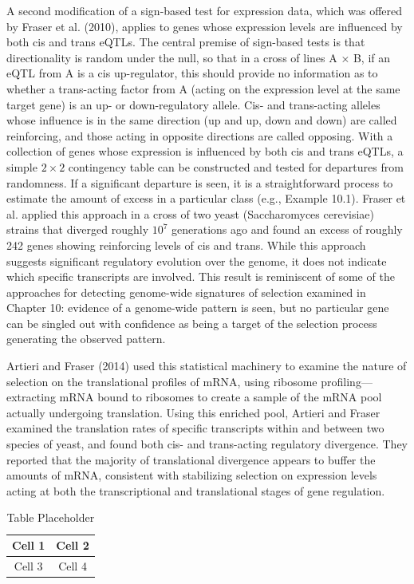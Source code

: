 \documentclass{article}
\begin{document}
A second modification of a sign-based test for expression data, which was offered by Fraser et al. (2010), applies to genes whose expression levels are influenced by both cis and trans eQTLs. The central premise of sign-based tests is that directionality is random under the null, so that in a cross of lines A × B, if an eQTL from A is a cis up-regulator, this should provide no information as to whether a trans-acting factor from A (acting on the expression level at the same target gene) is an up- or down-regulatory allele. Cis- and trans-acting alleles whose influence is in the same direction (up and up, down and down) are called reinforcing, and those acting in opposite directions are called opposing. With a collection of genes whose expression is influenced by both cis and trans eQTLs, a simple  $ 2 \times 2 $ contingency table can be constructed and tested for departures from randomness. If a significant departure is seen, it is a straightforward process to estimate the amount of excess in a particular class (e.g., Example 10.1). Fraser et al. applied this approach in a cross of two yeast (Saccharomyces cerevisiae) strains that diverged roughly  $ 10^7 $ generations ago and found an excess of roughly 242 genes showing reinforcing levels of cis and trans. While this approach suggests significant regulatory evolution over the genome, it does not indicate which specific transcripts are involved. This result is reminiscent of some of the approaches for detecting genome-wide signatures of selection examined in Chapter 10: evidence of a genome-wide pattern is seen, but no particular gene can be singled out with confidence as being a target of the selection process generating the observed pattern.

Artieri and Fraser (2014) used this statistical machinery to examine the nature of selection on the translational profiles of mRNA, using ribosome profiling—extracting mRNA bound to ribosomes to create a sample of the mRNA pool actually undergoing translation. Using this enriched pool, Artieri and Fraser examined the translation rates of specific transcripts within and between two species of yeast, and found both cis- and trans-acting regulatory divergence. They reported that the majority of translational divergence appears to buffer the amounts of mRNA, consistent with stabilizing selection on expression levels acting at both the transcriptional and translational stages of gene regulation.

\begin{table}[h]
\centering
\begin{tabular}{|c|c|}
\hline
Cell 1 & Cell 2 \\
\hline
Cell 3 & Cell 4 \\
\hline
\end{tabular}
\caption{Table Placeholder}
\end{table}
\end{document}

